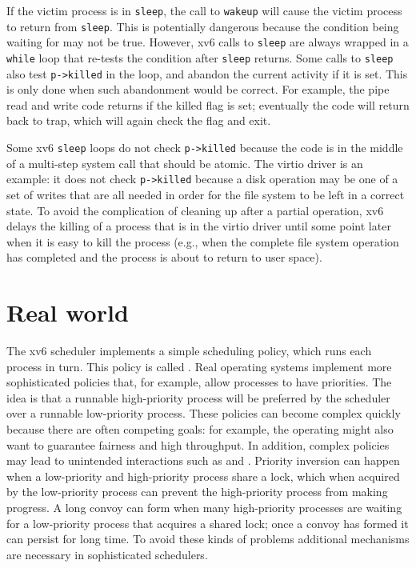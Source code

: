 If the victim process is in
\lstinline{sleep},
the call to
\lstinline{wakeup}
will cause the victim process to return from
\lstinline{sleep}.
This is potentially dangerous because 
the condition being waiting for may not be true.
However, xv6 calls to
\lstinline{sleep}
are always wrapped in a
\lstinline{while}
loop that re-tests the condition after
\lstinline{sleep}
returns.
Some calls to
\lstinline{sleep}
also test
\lstinline{p->killed}
in the loop, and abandon the current activity if it is set.
This is only done when such abandonment would be correct.
For example, the pipe read and write code
returns if the killed flag is set; eventually the
code will return back to trap, which will again
check the flag and exit.

Some xv6 
\lstinline{sleep}
loops do not check
\lstinline{p->killed} 
because the code is in the middle of a multi-step
system call that should be atomic.
The virtio driver
is an example: it does not check
\lstinline{p->killed}
because a disk operation may be one of a set of
writes that are all needed in order for the file system to
be left in a correct state.
To avoid the complication of cleaning up after a partial operation, xv6 delays
the killing of a process that is in the virtio driver until some point later when
it is easy to kill the process (e.g., when the complete file system operation
has completed and the process is about to return to user space).
\section{Real world}

The xv6 scheduler implements a simple scheduling policy, which runs each process
in turn.  This policy is called
.
Real operating systems implement more sophisticated policies that, for example,
allow processes to have priorities.  The idea is that a runnable high-priority process
will be preferred by the scheduler over a runnable low-priority process.   These
policies can become complex quickly because there are often competing goals: for
example, the operating might also want to guarantee fairness and
high throughput.  In addition, complex policies may lead to unintended
interactions such as
and 
.
Priority inversion can happen when a low-priority and high-priority process
share a lock, which when acquired by the low-priority process can prevent the
high-priority process from making progress.  A long convoy can form when many
high-priority processes are waiting for a low-priority process that acquires a
shared lock; once a convoy has formed it can persist for long time.
To avoid these kinds of problems additional mechanisms are necessary in
sophisticated schedulers.

